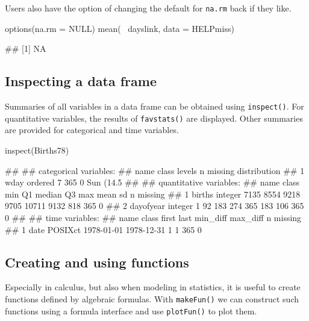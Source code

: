 \noindent
Users also have the option of changing the default for \texttt{na.rm}
back if they like.

\begin{Schunk}
\begin{Sinput}
options(na.rm = NULL)
mean(~ dayslink, data = HELPmiss)
\end{Sinput}
\begin{Soutput}
## [1] NA
\end{Soutput}
\end{Schunk}

\subsection{Inspecting a data frame}\label{inspecting-a-data-frame}

Summaries of all variables in a data frame can be obtained using
\texttt{inspect()}. For quantitative variables, the results of
\texttt{favstats()} are displayed. Other summaries are provided for
categorical and time variables.

\begin{Schunk}
\begin{Sinput}
inspect(Births78)
\end{Sinput}
\begin{Soutput}
## 
## categorical variables:  
##   name   class levels   n missing                                  distribution
## 1 wday ordered      7 365       0 Sun (14.5%
## 
## quantitative variables:  
##        name   class  min   Q1 median   Q3   max mean  sd   n missing
## 1    births integer 7135 8554   9218 9705 10711 9132 818 365       0
## 2 dayofyear integer    1   92    183  274   365  183 106 365       0
## 
## time variables:  
##   name   class      first       last min_diff max_diff   n missing
## 1 date POSIXct 1978-01-01 1978-12-31        1        1 365       0
\end{Soutput}
\end{Schunk}

\subsection{Creating and using
functions}\label{creating-and-using-functions}

Especially in calculus, but also when modeling in statistics, it is
useful to create functions defined by algebraic formulas. With
\texttt{makeFun()} we can construct such functions using a formula
interface and use \texttt{plotFun()} to plot them.


